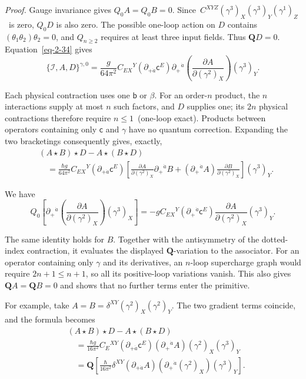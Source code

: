 \documentclass[11pt]{article}
\numberwithin{equation}{section}
\numberwithin{figure}{section}
\numberwithin{table}{section}
\begin{document}
\emph{Proof.} Gauge invariance gives $Q_0A=Q_0B=0$. Since~$C^{XYZ}(\gamma^3)_X(\gamma^3)_Y(\gamma^1)_Z$~is zero, $Q_0 D$ is also zero. The possible one-loop action on $D$ contains $(\theta_1\theta_2)\theta_2=0$, and $Q_{n\ge2}$ requires at least three input fields. Thus $\mathbf QD=0$. Equation~\eqref{eq-2-34} gives
\begin{equation*}
\{\mathcal I,A,D\}^{\gamma,0}
=\frac{g}{64\pi^2}C_{EX}{}^Y
(\partial_{+\dot a}\mathsf c^E)
\partial_+{}^{\dot a}
\left(\frac{\partial A}{\partial(\gamma^2)_X}\right)
(\gamma^3)_Y.
\end{equation*}

Each physical contraction uses one $\mathsf b$ or $\beta$. For an order-$n$ product, the $n$ interactions supply at most $n$ such factors, and $D$ supplies one; its $2n$ physical contractions therefore require $n\le1$~(one-loop exact). Products between operators containing only $\mathsf c$ and $\gamma$ have no quantum correction. Expanding the two bracketings consequently gives, exactly,
\begin{equation*}
\begin{aligned}
&(A\star B)\star D-A\star(B\star D)\\
&\quad=\frac{\hbar g}{64\pi^2}C_{EX}{}^Y
(\partial_{+\dot a}\mathsf c^E)
\left[
\frac{\partial A}{\partial(\gamma^2)_X}
\partial_+{}^{\dot a}B
+(\partial_+{}^{\dot a}A)
\frac{\partial B}{\partial(\gamma^2)_X}
\right](\gamma^3)_Y.
\end{aligned}
\end{equation*}

We have
\begin{equation*}
Q_0\left[
\partial_+{}^{\dot a}\left(
\frac{\partial A}{\partial(\gamma^2)_X}\right)(\gamma^3)_X
\right]
=-gC_{EX}{}^Y(\partial_+{}^{\dot a}\mathsf c^E)
\frac{\partial A}{\partial(\gamma^2)_X}(\gamma^3)_Y.
\end{equation*}

The same identity holds for $B$. Together with the antisymmetry of the dotted-index contraction, it evaluates the displayed $\mathbf Q$-variation to the associator. For an operator containing only $\gamma$ and its derivatives, an $n$-loop supercharge graph would require $2n+1\le n+1$, so all its positive-loop variations vanish. This also gives $\mathbf QA=\mathbf QB=0$ and shows that no further terms enter the primitive.~\hfill\qedsymbol

For example, take $A=B=\delta^{XY}(\gamma^2)_X(\gamma^2)_Y$. The two gradient terms coincide, and the formula becomes
\begin{equation}\label{eq-ring-explicit-associator}
\begin{aligned}
&(A\star B)\star D-A\star(B\star D)\\
&\quad=\frac{\hbar g}{16\pi^2}C_E{}^{XY}
(\partial_{+\dot a}\mathsf c^E)(\partial_+{}^{\dot a}A)
(\gamma^2)_X(\gamma^3)_Y\\
&\quad=\mathbf Q\left[
\frac{\hbar}{16\pi^2}\delta^{XY}
(\partial_{+\dot a}A)
(\partial_+{}^{\dot a}(\gamma^2)_X)(\gamma^3)_Y\right].
\end{aligned}
\end{equation}
\end{document}
